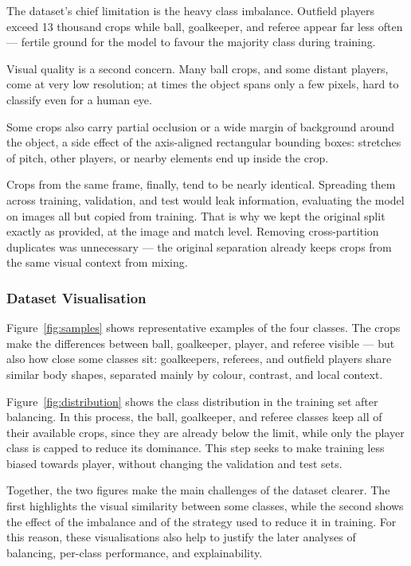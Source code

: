 \documentclass[preprint,12pt]{elsarticle}
\begin{document}
The dataset's chief limitation is the heavy class imbalance. Outfield players exceed 13 thousand crops while ball, goalkeeper, and referee appear far less often --- fertile ground for the model to favour the majority class during training.

Visual quality is a second concern. Many ball crops, and some distant players, come at very low resolution; at times the object spans only a few pixels, hard to classify even for a human eye.

Some crops also carry partial occlusion or a wide margin of background around the object, a side effect of the axis-aligned rectangular bounding boxes: stretches of pitch, other players, or nearby elements end up inside the crop.

Crops from the same frame, finally, tend to be nearly identical. Spreading them across training, validation, and test would leak information, evaluating the model on images all but copied from training. That is why we kept the original split exactly as provided, at the image and match level. Removing cross-partition duplicates was unnecessary --- the original separation already keeps crops from the same visual context from mixing.

\subsubsection{Dataset Visualisation}

Figure~\ref{fig:samples} shows representative examples of the four classes. The crops make the differences between ball, goalkeeper, player, and referee visible --- but also how close some classes sit: goalkeepers, referees, and outfield players share similar body shapes, separated mainly by colour, contrast, and local context.

Figure~\ref{fig:distribution} shows the class distribution in the training set after balancing. In this process, the ball, goalkeeper, and referee classes keep all of their available crops, since they are already below the limit, while only the player class is capped to reduce its dominance. This step seeks to make training less biased towards player, without changing the validation and test sets.

Together, the two figures make the main challenges of the dataset clearer. The first highlights the visual similarity between some classes, while the second shows the effect of the imbalance and of the strategy used to reduce it in training. For this reason, these visualisations also help to justify the later analyses of balancing, per-class performance, and explainability.
\end{document}
